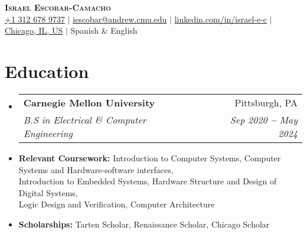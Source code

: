 \documentclass[letterpaper,11pt]{article}
\makeatletter
\newcommand{\resumeItem}[1]{
  \item\small{
    {#1 \vspace{-2pt}}
  }
}
\newcommand{\resumeEducationHeading}[6]{
  \vspace{-2pt}\item
    \begin{tabular*}{0.97\textwidth}[t]{l@{\extracolsep{\fill}}r}
      \textbf{#1} & #2 \\ %
      \textit{\small#3} & \textit{\small #4} \\ %
    \end{tabular*}\vspace{-5pt}
}
\newcommand{\resumeSubHeadingListStart}{\begin{itemize}[leftmargin=0.15in, label={}]}
\newcommand{\resumeSubHeadingListEnd}{\end{itemize}}
\newcommand{\resumeItemListStart}{\begin{itemize}}
\newcommand{\resumeItemListEnd}{\end{itemize}\vspace{-5pt}}
\makeatother
\begin{document}

\begin{center}
    \textbf{\Huge \scshape Israel Escobar-Camacho} \\ \vspace{3pt}
    \small
    \faMobile \hspace{.5pt} \href{tel:13126789737}{+1 312 678 9737}
    $|$
    \faAt \hspace{.5pt} \href{mailto:iescobar@andrew.cmu.edu}{iescobar@andrew.cmu.edu}
    $|$
    \faLinkedinSquare \hspace{.5pt} \href{https://www.linkedin.com/in/israel-e-c/}{linkedin.com/in/israel-e-c}
    $|$
    \faMapMarker \hspace{.5pt} \href{}{Chicago, IL, US}
    $|$
    \faLanguage \hspace{.5pt} {Spanish \& English}
\end{center}




\section{Education}
  \vspace{3pt}
  \resumeSubHeadingListStart

    \resumeEducationHeading
      {Carnegie Mellon University
      }{Pittsburgh, PA}
      {B.S in Electrical \& Computer Engineering}{Sep 2020 \textbf{--} May 2024}


  \resumeSubHeadingListEnd

  \resumeItemListStart
      \resumeItem{\textbf{Relevant Coursework:}{ Introduction to Computer Systems, Computer Systems and Hardware-software interfaces,\\ \hspace{111pt}
      Introduction to Embedded Systems,
      Hardware
      Structure and Design of Digital Systems,\\ \hspace{111pt}
      Logic Design and Verification,
      Computer Architecture
      }}
      \resumeItem{\textbf{Scholarships:}{ Tarten Scholar, Renaissance Scholar, Chicago Scholar}}
      \vspace{3pt}
  \resumeItemListEnd
\end{document}
